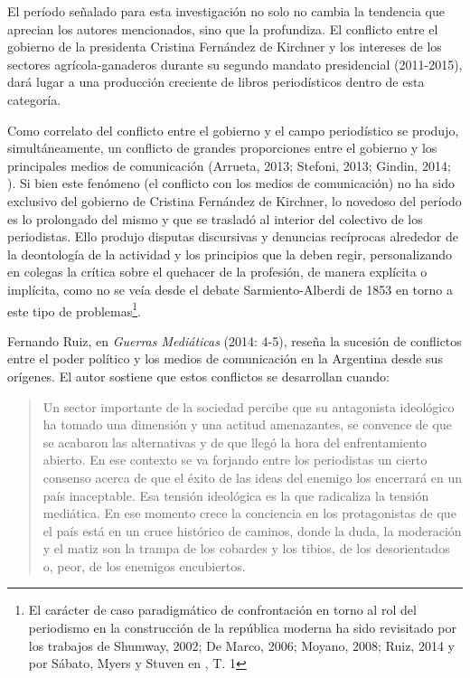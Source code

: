 El período señalado para esta investigación no solo no cambia la tendencia que aprecian los autores mencionados, sino que la profundiza. El conflicto entre el gobierno de la presidenta Cristina Fernández de Kirchner y los intereses de los sectores agrícola-ganaderos durante su segundo mandato presidencial (2011-2015), dará lugar a una producción creciente de libros periodísticos dentro de esta categoría.

Como correlato del conflicto entre el gobierno y el campo periodístico se produjo, simultáneamente, un conflicto de grandes proporciones entre el gobierno y los principales medios de comunicación (Arrueta, 2013; Stefoni, 2013; Gindin, 2014; \cite{@6979-URE2014}). Si bien este fenómeno (el conflicto con los medios de comunicación) no ha sido exclusivo del gobierno de Cristina Fernández de Kirchner, lo novedoso del período es lo prolongado del mismo y que se trasladó al interior del colectivo de los periodistas. Ello produjo disputas discursivas y denuncias recíprocas alrededor de la deontología de la actividad y los principios que la deben regir, personalizando en colegas la crítica sobre el quehacer de la profesión, de manera explícita o implícita, como no se veía desde el debate Sarmiento-Alberdi de 1853 en torno a este tipo de problemas\footnote{El carácter de caso paradigmático de confrontación en torno al rol del periodismo en la construcción de la república moderna ha sido revisitado por los trabajos de Shumway, 2002; De Marco, 2006; Moyano, 2008; Ruiz, 2014 y por Sábato, Myers y Stuven en \cite{@6966-ALTAMIRANO2008}, T. 1}.

Fernando Ruiz, en \emph{Guerras Mediáticas} (2014: 4-5), reseña la sucesión de conflictos entre el poder político y los medios de comunicación en la Argentina desde sus orígenes. El autor sostiene que estos conflictos se desarrollan cuando:

\begin{quote}
Un sector importante de la sociedad percibe que su antagonista ideológico ha tomado una dimensión y una actitud amenazantes, se convence de que se acabaron las alternativas y de que llegó la hora del enfrentamiento abierto. En ese contexto se va forjando entre los periodistas un cierto consenso acerca de que el éxito de las ideas del enemigo los encerrará en un país inaceptable. Esa tensión ideológica es la que radicaliza la tensión mediática. En ese momento crece la conciencia en los protagonistas de que el país está en un cruce histórico de caminos, donde la duda, la moderación y el matiz son la trampa de los cobardes y los tibios, de los desorientados o, peor, de los enemigos encubiertos.
\end{quote}

